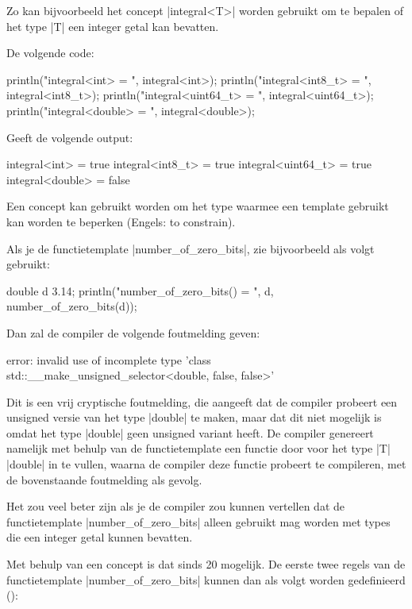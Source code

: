 \begin{cpplstShortInline}
Zo kan bijvoorbeeld het concept |integral<T>| worden gebruikt om te bepalen of het type |T| een integer getal kan bevatten.

De volgende code:
\begin{cpplstfragment}
    println("integral<int> = {}", integral<int>);
    println("integral<int8_t> = {}", integral<int8_t>);
    println("integral<uint64_t> = {}", integral<uint64_t>);
    println("integral<double> = {}", integral<double>);
\end{cpplstfragment}

Geeft de volgende output:
\begin{coutput}
integral<int> = true
integral<int8_t> = true
integral<uint64_t> = true
integral<double> = false
\end{coutput}

Een concept kan gebruikt worden om het type waarmee een template gebruikt kan worden te beperken (Engels: to constrain).

Als je de functietemplate |number_of_zero_bits|, zie  bijvoorbeeld als volgt gebruikt:
\begin{cpplstfragment}
    double d {3.14};
    println("number_of_zero_bits({}) = {}", d, number_of_zero_bits(d));
\end{cpplstfragment}

Dan zal de compiler de volgende foutmelding geven:
\begin{lstfragment}
error: invalid use of incomplete type 'class std::__make_unsigned_selector<double, false, false>'
\end{lstfragment}

Dit is een vrij cryptische foutmelding, die aangeeft dat de compiler probeert een unsigned versie van het type |double| te maken, maar dat dit niet mogelijk is omdat het type |double| geen unsigned variant heeft.
De compiler genereert namelijk met behulp van de functietemplate een functie door voor het type |T| |double| in te vullen, waarna de compiler deze functie probeert te compileren, met de bovenstaande foutmelding als gevolg.

Het zou veel beter zijn als je de compiler zou kunnen vertellen dat de functietemplate |number_of_zero_bits| alleen gebruikt mag worden met types die een integer getal kunnen bevatten.

Met behulp van een concept is dat sinds \Cpp{}20 mogelijk.
De eerste twee regels van de functietemplate |number_of_zero_bits| kunnen dan als volgt worden gedefinieerd ():


\end{cpplstShortInline}
